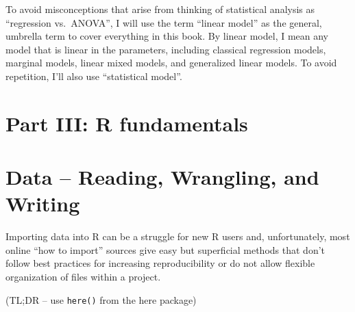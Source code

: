 \documentclass[]{book}
\begin{document}
To avoid misconceptions that arise from thinking of statistical analysis as ``regression vs.~ANOVA'', I will use the term ``linear model'' as the general, umbrella term to cover everything in this book. By linear model, I mean any model that is linear in the parameters, including classical regression models, marginal models, linear mixed models, and generalized linear models. To avoid repetition, I'll also use ``statistical model''.

\hypertarget{part-iii-r-fundamentals}{%
\chapter*{Part III: R fundamentals}\label{part-iii-r-fundamentals}}

\hypertarget{data-reading-wrangling-and-writing}{%
\chapter{Data -- Reading, Wrangling, and Writing}\label{data-reading-wrangling-and-writing}}

Importing data into R can be a struggle for new R users and, unfortunately, most online ``how to import'' sources give easy but superficial methods that don't follow best practices for increasing reproducibility or do not allow flexible organization of files within a project.

(TL;DR -- use \texttt{here()} from the here package)
\end{document}
